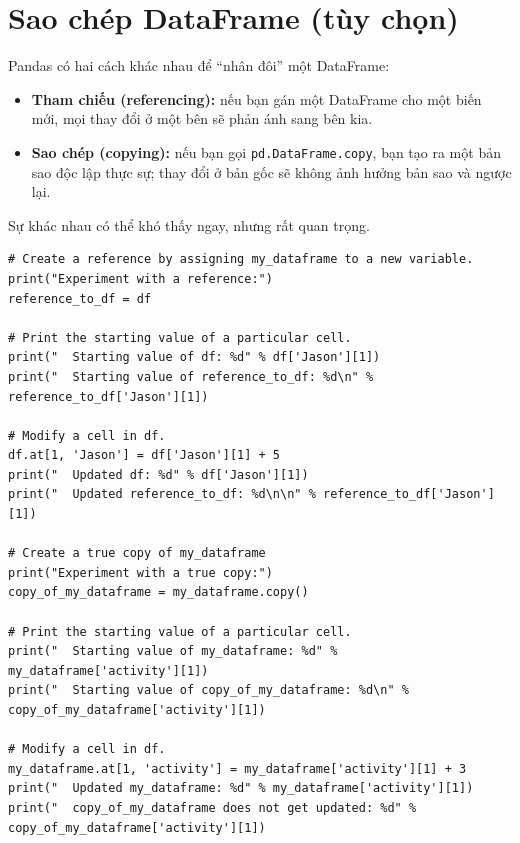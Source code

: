 \documentclass[12pt,a4paper]{article}
\begin{document}
\section{Sao chép DataFrame (tùy chọn)}

\begin{dongco}[title={Vì sao cần phân biệt tham chiếu và sao chép?}]
Pandas có hai cách khác nhau để ``nhân đôi'' một DataFrame:
\begin{itemize}
  \item \textbf{Tham chiếu (referencing):} nếu bạn gán một DataFrame cho một biến mới, mọi thay đổi ở một bên sẽ phản ánh sang bên kia.
  \item \textbf{Sao chép (copying):} nếu bạn gọi \texttt{pd.DataFrame.copy}, bạn tạo ra một bản sao độc lập thực sự; thay đổi ở bản gốc sẽ không ảnh hưởng bản sao và ngược lại.
\end{itemize}
Sự khác nhau có thể khó thấy ngay, nhưng rất quan trọng.
\end{dongco}

\begin{lstlisting}
# Create a reference by assigning my_dataframe to a new variable.
print("Experiment with a reference:")
reference_to_df = df

# Print the starting value of a particular cell.
print("  Starting value of df: %d" % df['Jason'][1])
print("  Starting value of reference_to_df: %d\n" % reference_to_df['Jason'][1])

# Modify a cell in df.
df.at[1, 'Jason'] = df['Jason'][1] + 5
print("  Updated df: %d" % df['Jason'][1])
print("  Updated reference_to_df: %d\n\n" % reference_to_df['Jason'][1])

# Create a true copy of my_dataframe
print("Experiment with a true copy:")
copy_of_my_dataframe = my_dataframe.copy()

# Print the starting value of a particular cell.
print("  Starting value of my_dataframe: %d" % my_dataframe['activity'][1])
print("  Starting value of copy_of_my_dataframe: %d\n" % copy_of_my_dataframe['activity'][1])

# Modify a cell in df.
my_dataframe.at[1, 'activity'] = my_dataframe['activity'][1] + 3
print("  Updated my_dataframe: %d" % my_dataframe['activity'][1])
print("  copy_of_my_dataframe does not get updated: %d" % copy_of_my_dataframe['activity'][1])
\end{lstlisting}
\end{document}
